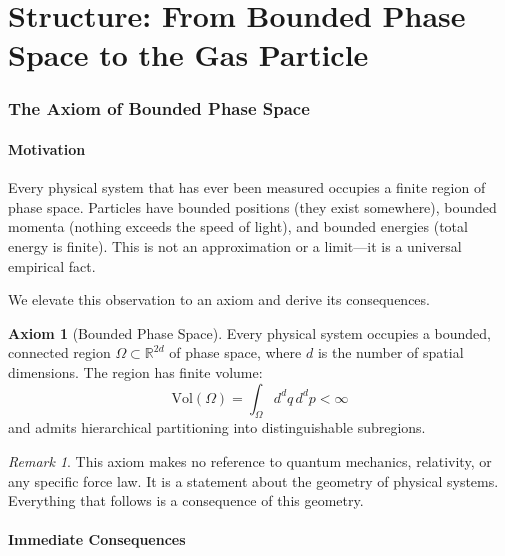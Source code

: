 \documentclass[twocolumn,10pt,a4paper]{article}
\theoremstyle{plain}
\theoremstyle{definition}
\newtheorem{axiom}{Axiom}
\theoremstyle{remark}
\newtheorem{remark}[theorem]{Remark}
\begin{document}

\part{Structure: From Bounded Phase Space to the Gas Particle}
\label{part:structure}

\section{The Axiom of Bounded Phase Space}
\label{sec:axiom}

\subsection{Motivation}

Every physical system that has ever been measured occupies a finite region of phase space. Particles have bounded positions (they exist somewhere), bounded momenta (nothing exceeds the speed of light), and bounded energies (total energy is finite). This is not an approximation or a limit---it is a universal empirical fact.

We elevate this observation to an axiom and derive its consequences.

\begin{axiom}[Bounded Phase Space]
\label{ax:bps}
Every physical system occupies a bounded, connected region $\Omega \subset \mathbb{R}^{2d}$ of phase space, where $d$ is the number of spatial dimensions. The region has finite volume:
\begin{equation}
    \mathrm{Vol}(\Omega) = \int_\Omega d^d q \, d^d p < \infty
\end{equation}
and admits hierarchical partitioning into distinguishable subregions.
\end{axiom}

\begin{remark}
This axiom makes no reference to quantum mechanics, relativity, or any specific force law. It is a statement about the geometry of physical systems. Everything that follows is a consequence of this geometry.
\end{remark}

\subsection{Immediate Consequences}
\end{document}
